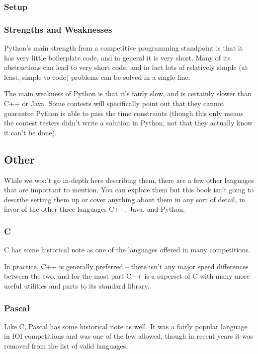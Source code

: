 \subsubsection{Setup}
\subsubsection{Strengths and Weaknesses}

Python's main strength from a competitive programming standpoint is that it has very little boilerplate code, and in general it is very short. Many of its abstractions can lead to very short code, and in fact lots of relatively simple (at least, simple to code) problems can be solved in a single line.

The main weakness of Python is that it's fairly slow, and is certainly slower than C++ or Java. Some contests will specifically point out that they cannot guarantee Python is able to pass the time constraints (though this only means the contest testers didn't write a solution in Python, not that they actually know it can't be done).

\subsection{Other}

While we won't go in-depth here describing them, there are a few other languages that are important to mention. You can explore them but this book isn't going to describe setting them up or cover anything about them in any sort of detail, in favor of the other three languages C++, Java, and Python.

\subsubsection{C}

C has some historical note as one of the languages offered in many competitions.

In practice, C++ is generally preferred -- there isn't any major speed differences between the two, and for the most part C++ is a superset of C with many more useful utilities and parts to its standard library.

\subsubsection{Pascal}

Like C, Pascal has some historical note as well. It was a fairly popular language in IOI competitions and was one of the few allowed, though in recent years it was removed from the list of valid languages.

